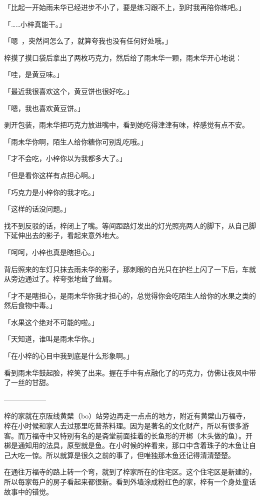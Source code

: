 \documentclass[UTF8]{ctexart}
\begin{document}
    「比起一开始雨未华已经进步不小了，要是练习跟不上，到时我再陪你练吧。」

    「……小梓真能干。」

    「嗯~，突然间怎么了，就算夸我也没有任何好处哦。」

    梓摸了摸口袋后拿出了两枚巧克力，然后给了雨未华一颗，雨未华开心地说：

    「哇，是黄豆味。」

    「最近我很喜欢这个，黄豆饼也很好吃。」

    「嗯，我也喜欢黄豆饼。」

    剥开包装，雨未华把巧克力放进嘴中，看到她吃得津津有味，梓感觉有点不安。

    「雨未华你啊，陌生人给你糖你可别乱吃哦。」

    「才不会吃，小梓你以为我都多大了。」

    「但是看你这样有点担心啊。」

    「巧克力是小梓你的我才吃。」

    「这样的话没问题。」

    找不到反驳的话，梓闭上了嘴。等间距路灯发出的灯光照亮两人的脚下，从自己脚下延伸出去的影子，看起来意外地大。

    「呵呵，小梓也真是瞎担心。」

    背后照来的车灯只抹去雨未华的影子，那刺眼的白光只在护栏上闪了一下后，车就从旁边通过了。梓夸张地耸了耸肩。

    「才不是瞎担心，是雨未华你我才担心的，总觉得你会吃陌生人给你的水果之类的然后食物中毒。」

    「水果这个绝对不可能的啦。」

    「天知道，谁叫是雨未华你。」

    「在小梓的心目中我到底是什么形象啊。」

    看到雨未华鼓起脸，梓笑了出来。握在手中有点融化了的巧克力，仿佛让夜风中带了一丝的甘甜。

    ——————

    梓的家就在京阪线黄檗（bo）站旁边再走一点点的地方，附近有黄檗山万福寺，梓在小时候和家人去过那里吃普茶料理。因为是著名的文化财产，所以有很多游客。而万福寺中又特别有名的是斋堂前面挂着的长鱼形的开梆（木头做的鱼）。开梆是通知用的法具，原型就是鱼。在小时候的梓看来，那口中含着珠子的木鱼让自己大吃一惊。所以就算是很久之前的事了，但唯独那木鱼还记得清清楚楚。

    在通往万福寺的路上转一个弯，就到了梓家所在的住宅区。这个住宅区是新建的，所以每家每户的房子看起来都很新。看到外墙涂成粉红色的家，梓有一个身处童话故事中的错觉。
\end{document}
